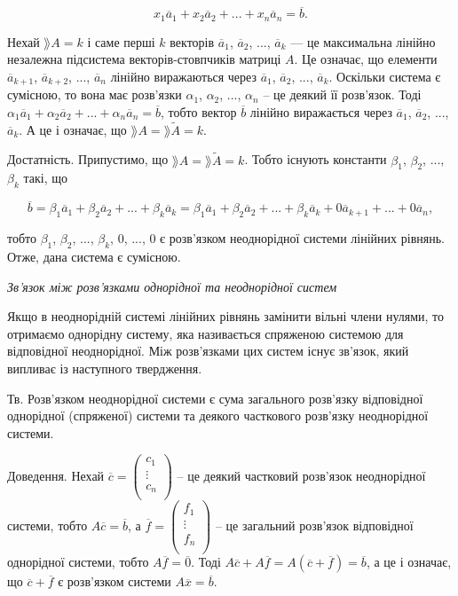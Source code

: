 $$x_1 \overline{a}_1 + x_2 \overline{a}_2 + ... + x_n \overline{a}_n = \overline{b}.$$

Нехай $\rang A = k$ і саме перші $k$ векторів $\overline{a}_1$, $\overline{a}_2$, ..., $\overline{a}_k$ ---
це максимальна лінійно незалежна підсистема векторів-стовпчиків матриці $A$. Це означає, що
елементи $\overline{a}_{k+1}$, $\overline{a}_{k+2}$, ..., $\overline{a}_{n}$ лінійно виражаються через 
$\overline{a}_1$, $\overline{a}_2$, ..., $\overline{a}_k$. Оскільки
система є сумісною, то вона має розв’язки $\alpha_1$, $\alpha_2$, ..., $\alpha_n$ -- це деякий її розв’язок.
Тоді $\alpha_1 \overline{a}_1 + \alpha_2 \overline{a}_2 + ... + \alpha_n \overline{a}_n = \overline{b}$,
тобто вектор $\overline{b}$ лінійно виражається через $\overline{a}_1$, $\overline{a}_2$, ..., $\overline{a}_k$.
А це і означає, що $\rang A = \rang \tilde{A} = k$.

Достатність. Припустимо, що $\rang A = \rang \tilde{A} = k$. Тобто існують константи
$\beta_1$, $\beta_2$, ..., $\beta_k$ такі, що

$$\overline{b} = \beta_1 \overline{a}_1 + \beta_2 \overline{a}_2 + ... + \beta_k \overline{a}_k
 = \beta_1 \overline{a}_1 + \beta_2 \overline{a}_2 + ... + \beta_k \overline{a}_k + 0 \overline{a}_{k+1} + ... + 0 \overline{a}_{n},$$

тобто $\beta_1$, $\beta_2$, ..., $\beta_k$, 0, ..., 0 є розв’язком неоднорідної системи лінійних рівнянь.
Отже, дана система є сумісною.


\textit{Зв’язок між розв’язками однорідної та неоднорідної систем}


Якщо в неоднорідній системі лінійних рівнянь замінити вільні члени нулями,
то отримаємо однорідну систему, яка називається спряженою системою для
відповідної неоднорідної. Між розв’язками цих систем існує зв’язок, який випливає
із наступного твердження.


Тв. Розв’язком неоднорідної системи є сума загального розв’язку відповідної
однорідної (спряженої) системи та деякого часткового розв’язку неоднорідної
системи. 


Доведення. Нехай $\overline{c} = \begin{pmatrix}
	c_1 \\
	\vdots \\
	c_n \\
\end{pmatrix}$ -- це деякий частковий розв’язок неоднорідної
системи, тобто $A \overline{c} = \overline{b}$, а $\overline{f} = \begin{pmatrix}
	f_1 \\
	\vdots \\
	f_n \\
\end{pmatrix}$ -- це загальний розв’язок відповідної однорідної
системи, тобто $A \overline{f} = \overline{0}$. Тоді $A \overline{c} + A \overline{f} = A(\overline{c} + \overline{f}) = \overline{b}$,
а це і означає, що $\overline{c} + \overline{f}$ є
розв’язком системи $A \overline{x} = \overline{b}$.


